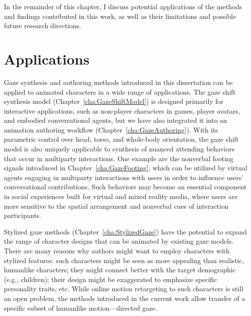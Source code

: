In the remainder of this chapter, I discuss potential applications of the methods and findings contributed in this work, as well as their limitations and possible future research directions.

\section{Applications}

Gaze synthesis and authoring methods introduced in this dissertation can be applied to animated characters in a wide range of applications. The gaze shift synthesis model (Chapter~\ref{cha:GazeShiftModel}) is designed primarily for interactive applications, such as non-player characters in games, player avatars, and embodied conversational agents, but we have also integrated it into an animation authoring workflow (Chapter~\ref{cha:GazeAuthoring}).
With its parametric control over head, torso, and whole-body orientation, the gaze shift model is also uniquely applicable to synthesis of nuanced attending behaviors that occur in multiparty interactions. One example are the nonverbal footing signals introduced in Chapter~\ref{cha:GazeFooting}, which can be utilized by virtual agents engaging in multiparty interactions with users in order to influence users' conversational contributions. Such behaviors may become an essential component in social experiences built for virtual and mixed reality media, where users are more sensitive to the spatial arrangement and nonverbal cues of interaction participants.

Stylized gaze methods (Chapter~\ref{cha:StylizedGaze}) have the potential to expand the range of character designs that can be animated by existing gaze models. There are many reasons why authors might want to employ characters with stylized features: such characters might be seen as more appealing than realistic, humanlike characters; they might connect better with the target demographic (e.g., children); their design might be exaggerated to emphasize specific personality traits, etc. While online motion retargeting to such characters is still an open problem, the methods introduced in the current work allow transfer of a specific subset of humanlike motion---directed gaze.

